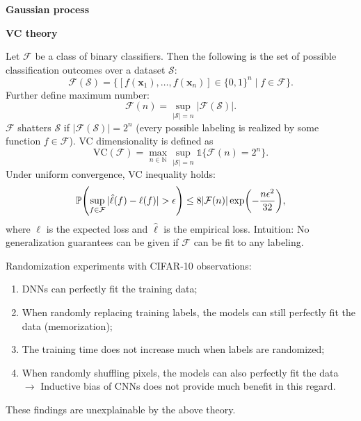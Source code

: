 \documentclass[10pt]{article}
\newenvironment{topic}[1]
{\textbf{\sffamily \footnotesize \colorbox{black}{\rlap{\textbf{\textcolor{white}{#1}}}\hspace{\linewidth}\hspace{-2\fboxsep}}}}
{}
\newenvironment{subtopic}[1]
{\vspace{0.1cm} \begin{center}\textbf{\footnotesize \sffamily #1}\end{center}}
{}
\renewcommand{\vec}[1]{\ensuremath{\mathbold{#1}}}
\begin{document}
\begin{multicols*}{3}
\begin{topic}{Bayesian learning}
\begin{subtopic}{Gaussian process}
        \end{subtopic}

    \end{topic}

    \begin{topic}{Statistical learning theory}

        \begin{subtopic}{VC theory}
            Let $\mathcal{F}$ be a class of binary classifiers. Then the following is the set of possible classification outcomes over a dataset $\mathcal{S}$: \[
                \mathcal{F}(\mathcal{S}) = \{ [f(\vec{x}_1), \ldots, f(\vec{x}_n)] \in \{ 0,1 \}^n \mid f \in \mathcal{F} \}.
            \]
            Further define maximum number: \[
                \mathcal{F}(n) = \sup_{|\mathcal{S}| = n} |\mathcal{F}(\mathcal{S})|.
            \]
            $\mathcal{F}$ shatters $\mathcal{S}$ if $|\mathcal{F}(\mathcal{S})| = 2^n$ (every
            possible labeling is realized by some function $f \in \mathcal{F}$). VC dimensionality is defined as \[
                \mathrm{VC}(\mathcal{F}) = \max_{n \in \mathbb{N}} \sup_{|\mathcal{S}|=n} \mathbb{1}\{ \mathcal{F}(n) = 2^n \}.
            \]
            Under uniform convergence, VC inequality holds: \[
                \mathbb{P}\lft( \sup_{f \in \mathcal{F}} |\hat{\ell}(f) - \ell(f)| > \epsilon \rgt) \leq 8 |\mathcal{F}(n)| \exp \lft( -\frac{n \epsilon^2}{32} \rgt),
            \]
            where $\ell$ is the expected loss and $\hat{\ell}$ is the empirical loss. Intuition: No
            generalization guarantees can be given if $\mathcal{F}$ can be fit to any labeling.

            Randomization experiments with CIFAR-10 observations:
            \begin{enumerate}[left=0pt]
                \item DNNs can perfectly fit the training data;
                \item When randomly replacing training labels, the models can still perfectly fit the data
                      (memorization);
                \item The training time does not increase much when labels are randomized;
                \item When randomly shuffling pixels, the models can also perfectly fit the data $\to$ Inductive bias of
                      CNNs does not provide much benefit in this regard.
            \end{enumerate}
            These findings are unexplainable by the above theory.


\end{subtopic}
\end{topic}
\end{multicols*}
\end{document}
